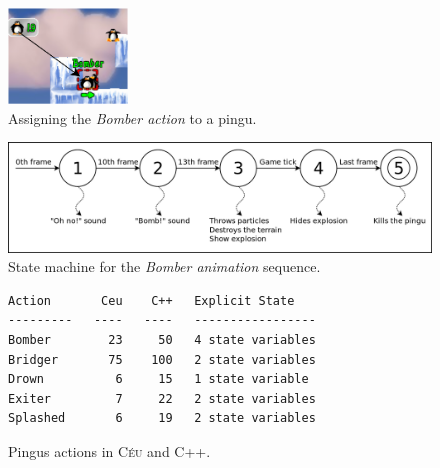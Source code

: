 \documentclass{vgtc}                          %
\newcommand{\CEU}{\textsc{C\'{e}u}\xspace}
\begin{document}
\begin{figure}[t]
\centering
\includegraphics[width=120px]{bomber-01}
\caption{ Assigning the \emph{Bomber action} to a pingu.
\label{fig.bomber.action}
}
\end{figure}

\begin{figure}[t]
\centering
\includegraphics[width=\columnwidth]{states}
\caption{ State machine for the \emph{Bomber animation} sequence.
\label{fig.bomber.fsm}
}
\end{figure}

\begin{figure}[t]
\begin{verbatim}
Action       Ceu    C++   Explicit State
---------   ----   ----   -----------------
Bomber        23     50   4 state variables
Bridger       75    100   2 state variables
Drown          6     15   1 state variable
Exiter         7     22   2 state variables
Splashed       6     19   2 state variables
\end{verbatim}
\caption{Pingus actions in \CEU and C++.
\label{tab.actions}
}
\end{figure}
\end{document}
